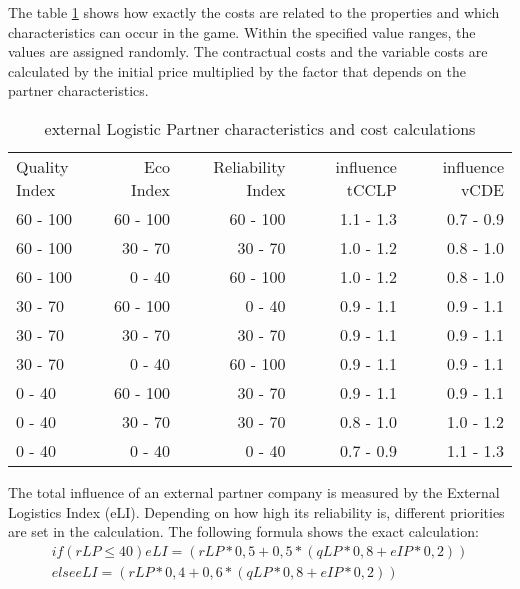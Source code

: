 The table \ref{External_logistic_partner_characteristics} shows how exactly the costs are related to the properties and which characteristics can occur in the game. Within the specified value ranges, the values are assigned randomly. 
The contractual costs and the variable costs are calculated by the initial price multiplied by the factor that depends on the partner characteristics.

\begin{table}[ht]
    \centering
    \begin{tabular}{|l|r|r|r|r|}
    \hline
    Quality Index & Eco Index & Reliability Index & influence tCCLP & influence vCDE \\
    60 - 100      & 60 - 100   & 60 - 100  & 1.1 - 1.3    & 0.7 - 0.9     \\
    60 - 100      & 30 - 70    & 30 - 70   & 1.0 - 1.2    & 0.8 - 1.0     \\
    60 - 100      & 0 - 40     & 60 - 100  & 1.0 - 1.2    & 0.8 - 1.0     \\
    30 - 70       & 60 - 100   & 0 - 40    & 0.9 - 1.1    & 0.9 - 1.1     \\
    30 - 70       & 30 - 70    & 30 - 70   & 0.9 - 1.1    & 0.9 - 1.1     \\
    30 - 70       & 0 - 40     & 60 - 100  & 0.9 - 1.1    & 0.9 - 1.1     \\
    0 - 40        & 60 - 100   & 30 - 70   & 0.9 - 1.1    & 0.9 - 1.1     \\
    0 - 40        & 30 - 70    & 30 - 70   & 0.8 - 1.0    & 1.0 - 1.2     \\
    0 - 40        & 0 - 40     & 0 - 40    & 0.7 - 0.9    & 1.1 - 1.3     \\
    \hline
    \end{tabular}
    \caption{external Logistic Partner characteristics and cost calculations}
    \label{External_logistic_partner_characteristics}
\end{table}

The total influence of an external partner company is measured by the External Logistics Index (\gls{eLI}). Depending on how high its reliability is, different priorities are set in the calculation. The following formula shows the exact calculation: 
\begin{equation}
\label{func:externalLogisticIndex}
\begin{aligned}
    if (rLP ≤ 40) eLI = { (rLP*0,5 + 0,5*(qLP*0,8 + eIP*0,2)) } \\
    else eLI = { (rLP*0,4 + 0,6*(qLP*0,8 + eIP*0,2)) }
\end{aligned}
\end{equation}

